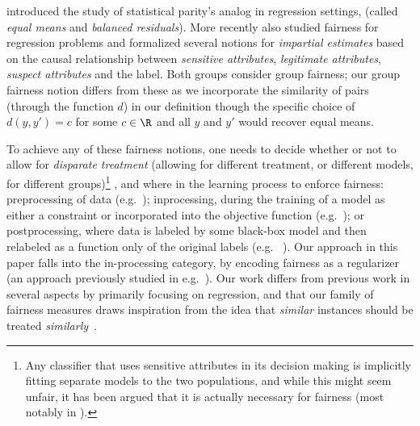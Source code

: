 \citet{CaldersKKAZ13} introduced the study of statistical parity's
analog in regression settings, (called \emph{equal means} and
\emph{balanced residuals}). More recently \citet{JohnsonFS16} also
studied fairness for regression problems and formalized several
notions for \emph{impartial estimates} based on the causal
relationship between \emph{sensitive attributes}, \emph{legitimate
  attributes}, \emph{suspect attributes} and the label.  Both groups
consider group fairness; our group fairness notion differs from these
as we incorporate the similarity of pairs (through the function $d$)
in our definition though the specific choice of
$d(y,y')=c$ for some $c\in\R$ and all $y$ and $y'$ would recover equal means.

To achieve any of these fairness notions, one needs to decide whether
or not to allow for \emph{disparate treatment} (allowing for different
treatment, or different models, for different groups)\footnote{Any
  classifier that uses sensitive attributes in its decision making is
  implicitly fitting separate models to the two populations, and while
  this might seem unfair, it has been argued that it is actually
  necessary for fairness (most notably in \citet{DworkHPRZ12}).}  , and
where in the learning process to enforce fairness: preprocessing of
data (e.g.~\cite{KamiranC11}); inprocessing, during the training of a
model as either a constraint or incorporated into the objective
function (e.g.~\cite{FishKL16, KamishimaAAS12,ZafarVGG15}); or
postprocessing, where data is labeled by some black-box model and then
relabeled as a function only of the original labels
(e.g. ~\cite{HardtPS16}).  Our approach in this paper falls into the
in-processing category, by encoding fairness as a regularizer (an
approach previously studied in
e.g.~\cite{KamishimaAAS12,ZafarVGG15,ZafarVGG17}). Our work differs
from previous work in several aspects by primarily focusing on
regression, and that our family of fairness measures draws inspiration
from the idea that \emph{similar} instances should be treated
\emph{similarly}~\cite{DworkHPRZ12, ZemelWSPD13}.



